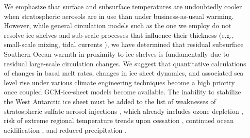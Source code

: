 \documentclass{nature}
\begin{document}
We emphasize that surface and subsurface temperatures are undoubtedly cooler when stratospheric aerosols are in use than under business-as-usual warming. However, while general circulation models such as the one we employ do not resolve ice shelves and sub-scale processes that influence their thickness (e.g., small-scale mixing, tidal currents \cite{joughin11}), we have determined that residual subsurface Southern Ocean warmth in proximity to ice shelves is fundamentally due to residual large-scale circulation changes. We suggest that quantitative calculations of changes in basal melt rates, changes in ice sheet dynamics, and associated sea level rise under various climate engineering techniques become a high priority once coupled GCM-ice-sheet models become available. The inability to stabilize the West Antarctic ice sheet must be added to the list of weaknesses of stratospheric sulfate aerosol injections \cite{robock08c}, which already includes ozone depletion \cite{tilmes08,heckendorn09}, risk of extreme regional temperature trends upon cessation \cite{jones13,mccusker14}, continued ocean acidification \cite{feely04}, and reduced precipitation \cite{bala08}.


\end{document}
